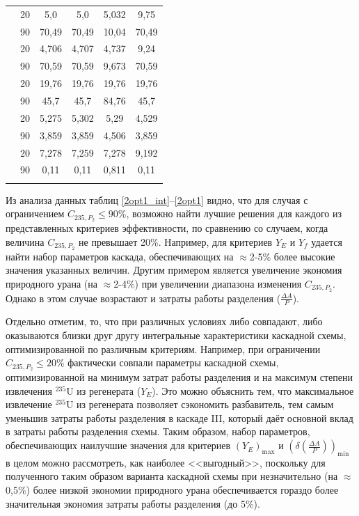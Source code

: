 \begin{table}[ht]
\begin{tabular}{|r|r||c|c|c|c|}
            & 20 & 5,0 & 5,0 & 5,032 & 9,75 \\\cline{2-6} 
            & 90 & 70,49 & 70,49 & 10,04 & 70,49\\
        \Xhline{2\arrayrulewidth}
        \multirow{2}{*}{$C_{235,W_{2}}, \%$}
            & 20 & 4,706 & 4,707 & 4,737 & 9,24 \\\cline{2-6} 
            & 90 & 70,59 & 70,59 & 9,673 & 70,59\\
    \Xhline{2\arrayrulewidth}
        \multirow{2}{*}{$C_{235,P_{2}}, \%$}
            & 20 & 19,76 & 19,76 & 19,76 & 19,76 \\\cline{2-6} 
            & 90 & 45,7 & 45,7 & 84,76 & 45,7\\
        \Xhline{2\arrayrulewidth}
        \multirow{2}{*}{$C_{235,P_{n}}, \%$}
            & 20 & 5,275 & 5,302 & 5,29 & 4,529 \\\cline{2-6} 
            & 90 & 3,859 & 3,859 & 4,506 & 3,859\\
        \Xhline{2\arrayrulewidth}           
        \multirow{2}{*}{$P_2$, кг}
        & 20 & 7,278 & 7,259 & 7,278 & 9,192 \\\cline{2-6} 
        & 90 & 0,11 & 0,11 & 0,811 & 0,11\\
\Xhline{2\arrayrulewidth}
        \end{tabular}
\end{table}


Из анализа данных таблиц \ref{2opt1_int}--\ref{2opt1} видно, что для случая с ограничением $C_{235,{P_2}} \leq 90\%$, возможно найти лучшие решения для каждого из представленных критериев эффективности, по сравнению со случаем, когда величина $C_{235,{P_2}}$ не превышает 20\%. Например, для критериев $Y_E$ и $Y_f$ удается найти набор параметров каскада, обеспечивающих на $\approx$2-5\% более высокие значения указанных величин. Другим примером является увеличение экономия природного урана (на $\approx$2-4\%) при увеличении диапазона изменения $C_{235,{P_2}}$. Однако в этом случае возрастают и затраты работы разделения ($\frac{\Delta A}{P}$).

Отдельно отметим, то, что при различных условиях либо совпадают, либо оказываются близки друг другу интегральные характеристики каскадной схемы, оптимизированной по различным критериям. Например, при ограничении $C_{235,{P_2}} \leq 20\%$ фактически совпали параметры каскадной схемы, оптимизированной на минимум затрат работы разделения и на максимум степени извлечения $^{235}$U из регенерата ($Y_E$). Это можно объяснить тем, что максимальное извлечение $^{235}$U из регенерата позволяет сэкономить разбавитель, тем самым уменьшив затраты работы разделения в каскаде III, который даёт основной вклад в затраты работы разделения схемы. Таким образом, набор параметров, обеспечивающих наилучшие значения для критериев $(Y_{E})_\text{max}$ и $(\delta(\frac{\Delta A}{P}))_\text{min}$ в целом можно рассмотреть, как наиболее <<выгодный>>, поскольку для полученного таким образом варианта каскадной схемы при незначительно (на $\approx$0,5\%) более низкой экономии природного урана обеспечивается гораздо более значительная экономия затраты работы разделения (до 5\%). 

